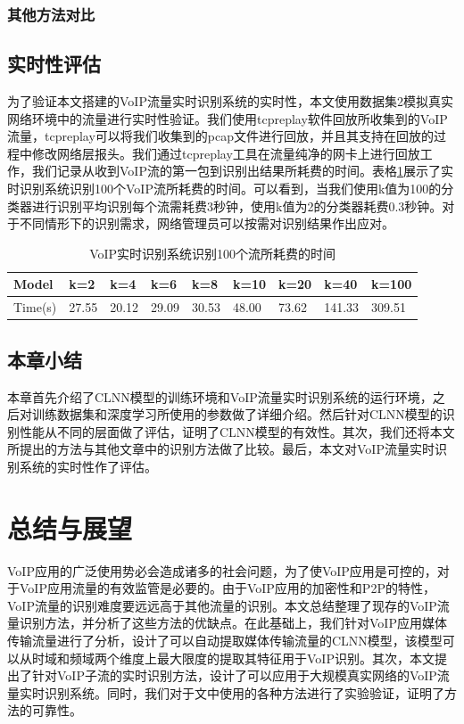 \subsection{其他方法对比}


\section{实时性评估}
为了验证本文搭建的VoIP流量实时识别系统的实时性，本文使用数据集2模拟真实网络环境中的流量进行实时性验证。我们使用tcpreplay软件回放所收集到的VoIP流量，tcpreplay可以将我们收集到的pcap文件进行回放，并且其支持在回放的过程中修改网络层报头。我们通过tcpreplay工具在流量纯净的网卡上进行回放工作，我们记录从收到VoIP流的第一包到识别出结果所耗费的时间。表格\ref{tab:time4folws}展示了实时识别系统识别100个VoIP流所耗费的时间。可以看到，当我们使用k值为100的分类器进行识别平均识别每个流需耗费3秒钟，使用k值为2的分类器耗费0.3秒钟。对于不同情形下的识别需求，网络管理员可以按需对识别结果作出应对。

\begin{table}
  \caption{VoIP实时识别系统识别100个流所耗费的时间}
  \label{tab:time4folws}
  \centering
  \begin{tabular}{l l l l l l l l l }
    \hline
    \textbf{Model} & \textbf{k=2} &\textbf{k=4}&\textbf{k=6}&\textbf{k=8}&\textbf{k=10}&\textbf{k=20}&\textbf{k=40}&\textbf{k=100}\\
    \hline
    Time(s)      & 27.55  & 20.12  &29.09&30.53&48.00&73.62&141.33&309.51  \\
    \hline
  \end{tabular}
\end{table}

\section{本章小结}
本章首先介绍了CLNN模型的训练环境和VoIP流量实时识别系统的运行环境，之后对训练数据集和深度学习所使用的参数做了详细介绍。然后针对CLNN模型的识别性能从不同的层面做了评估，证明了CLNN模型的有效性。其次，我们还将本文所提出的方法与其他文章中的识别方法做了比较。最后，本文对VoIP流量实时识别系统的实时性作了评估。



\chapter{总结与展望}
VoIP应用的广泛使用势必会造成诸多的社会问题，为了使VoIP应用是可控的，对于VoIP应用流量的有效监管是必要的。由于VoIP应用的加密性和P2P的特性，VoIP流量的识别难度要远远高于其他流量的识别。本文总结整理了现存的VoIP流量识别方法，并分析了这些方法的优缺点。在此基础上，我们针对VoIP应用媒体传输流量进行了分析，设计了可以自动提取媒体传输流量的CLNN模型，该模型可以从时域和频域两个维度上最大限度的提取其特征用于VoIP识别。其次，本文提出了针对VoIP子流的实时识别方法，设计了可以应用于大规模真实网络的VoIP流量实时识别系统。同时，我们对于文中使用的各种方法进行了实验验证，证明了方法的可靠性。

